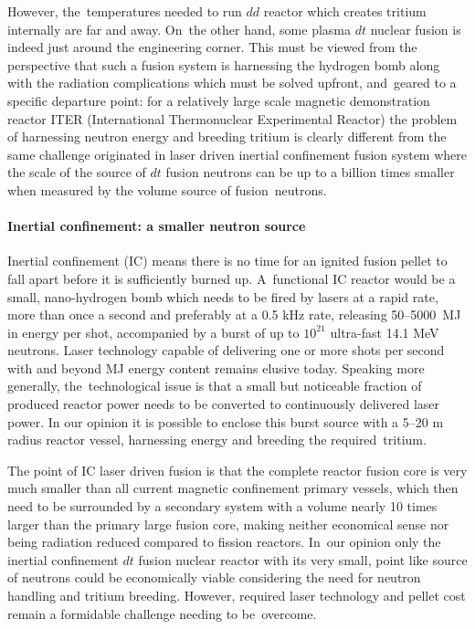 \documentclass[particles,article,accept,pdftex,moreauthors]{Definitions/mdpi}
\newcommand*{\xblue}{}
\begin{document}
However, the~temperatures needed to run $dd$ reactor which creates tritium internally are far and away. On~the other hand, some plasma $dt$ nuclear fusion is indeed just around the engineering corner. This must be viewed from the perspective that such a fusion system is harnessing the hydrogen bomb along with the radiation complications which must be solved upfront, and~geared to a specific departure point: for a relatively large scale magnetic demonstration reactor ITER (International Thermonuclear Experimental Reactor) the problem of harnessing neutron energy and breeding tritium is clearly different from the same challenge originated in laser driven inertial confinement fusion system where the scale of the source of $dt$ fusion neutrons can be up to a billion times smaller when measured by the volume source of fusion~neutrons.

\vspace{-6pt}\paragraph*{\bf Inertial confinement: a smaller neutron source}
Inertial confinement (IC) means there is no time for an ignited fusion pellet to fall apart before it is sufficiently burned up. A~functional IC reactor would be a small, nano-hydrogen bomb which needs to be fired by lasers at a  {\xblue rapid rate, more than once a second and preferably at a 0.5 kHz rate, releasing  50--5000 \,MJ in energy per shot, accompanied by a burst of up to $  10^{21}$ ultra-fast 14.1 MeV neutrons.   Laser technology capable of delivering one or more shots per second with and beyond MJ energy content remains elusive today. Speaking more generally, the~technological issue is that a small but noticeable fraction of produced reactor power needs to be converted to continuously delivered laser power.} In our opinion it is possible to enclose this burst source with a 5--20 m radius reactor vessel, harnessing energy and breeding the required~tritium.

The point of IC laser driven fusion is that the complete reactor fusion core is very much smaller than all current magnetic confinement primary vessels, which then need to be surrounded by a secondary system with a volume nearly 10 times larger than the primary large fusion core, making neither economical sense nor being radiation reduced compared to fission reactors. In~our opinion only the inertial confinement $dt$ fusion nuclear reactor with its very small, point like source of neutrons could be economically viable considering the need for neutron handling and tritium breeding. However, required laser technology and pellet cost remain a formidable challenge needing to be~overcome.
\end{document}
